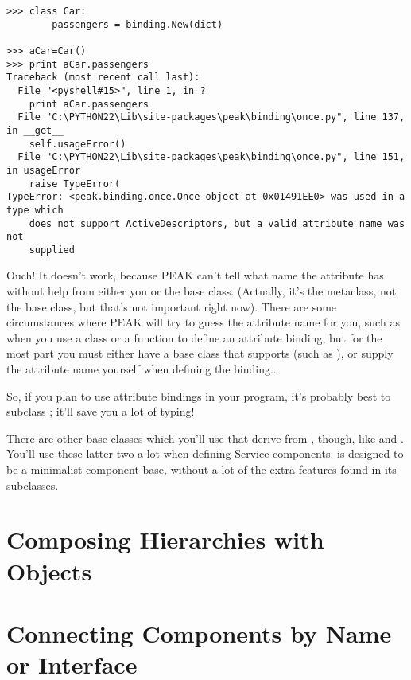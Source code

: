 \begin{verbatim}
>>> class Car:
        passengers = binding.New(dict)
	
>>> aCar=Car()
>>> print aCar.passengers
Traceback (most recent call last):
  File "<pyshell#15>", line 1, in ?
    print aCar.passengers
  File "C:\PYTHON22\Lib\site-packages\peak\binding\once.py", line 137, in __get__
    self.usageError()
  File "C:\PYTHON22\Lib\site-packages\peak\binding\once.py", line 151, in usageError
    raise TypeError(
TypeError: <peak.binding.once.Once object at 0x01491EE0> was used in a type which
    does not support ActiveDescriptors, but a valid attribute name was not
    supplied

\end{verbatim}

Ouch!  It doesn't work, because PEAK can't tell what name the attribute
has without help from either you or the base class.  (Actually, it's the
metaclass, not the base class, but that's not important right now).  There
are some circumstances where PEAK will try to guess the attribute name for you,
such as when you use a class or a  function to define an attribute binding, but
for the most part you must either have a base class that supports
 (such as ), or supply
the attribute name yourself when defining the binding..

So, if you plan to use attribute bindings in your program, it's probably best
to subclass ; it'll save you a lot of typing!

There are other  base classes which you'll use that
derive from , though, like  and
.  You'll use these latter two a lot when defining
Service components.   is designed to be a minimalist
component base, without a lot of the extra features found in its subclasses.







\section{Composing Hierarchies with  Objects}



\section{Connecting Components by Name or Interface}

